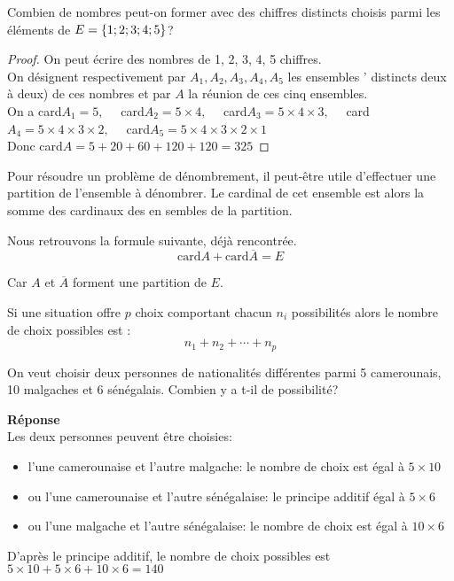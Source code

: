 \begin{exercice}
Combien de nombres peut-on former avec des chiffres distincts choisis parmi les éléments de  $ E=\left\{1;2;3;4;5\right\} $?
\end{exercice}
\begin{proof}
On peut écrire des nombres de 1, 2, 3, 4, 5 chiffres.\\
On désignent respectivement par $ A_{1}, A_{2}, A_{3}, A_{4}, A_{5} $ les ensembles ' distincts deux à deux) de ces nombres et par $ A $ la réunion de ces cinq ensembles.\\
On a card$ A_{1}=5, \quad$ card$ A_{2}=5 \times 4 ,\quad$ card$ A_{3}=5 \times 4\times 3, \quad $ card$ A_{4}=5 \times 4\times 3\times 2,\quad  $ card$ A_{5}=5 \times 4\times 3\times 2 \times 1 $\\
Donc card$ A = 5+20+60+120+120=325$
\end{proof}
\begin{remark}
Pour résoudre un problème de dénombrement, il peut-être utile d'effectuer une partition de l'ensemble à dénombrer. Le cardinal de cet ensemble est alors la somme des cardinaux des en sembles de la partition.
\end{remark} 
\begin{property}
Nous retrouvons la formule suivante, déjà rencontrée.
\[\textrm{card}A +\textrm{card}\overline{A}= E \]

Car $ A $ et $\overline{A} $ forment une partition de $ E. $
\end{property}
\begin{corollary}
Si une situation offre $ p $ choix comportant chacun $ n_{i} $ possibilités alors le nombre de choix possibles est :
\[n_{1}+ n_{2}+ \cdots + n_{p} \]
\end{corollary}
\begin{example}
On veut choisir deux personnes de nationalités différentes parmi 5 camerounais, 10 malgaches et 6 sénégalais.  Combien y a t-il de possibilité?
\medskip

\textbf{Réponse}\\
Les deux personnes peuvent être choisies:
\begin{itemize}
\item l'une camerounaise et l'autre malgache:  le nombre de choix est égal à $ 5\times 10 $
\item  ou l'une camerounaise et l'autre sénégalaise: le principe additif égal à $ 5\times 6 $
\item ou l'une malgache et l'autre sénégalaise:  le nombre de choix est égal à $ 10\times 6 $
\end{itemize}
 D'après le principe additif, le nombre de choix possibles  est \\$ 5\times 10 +5\times 6 + 10\times 6 = 140$
\end{example}

